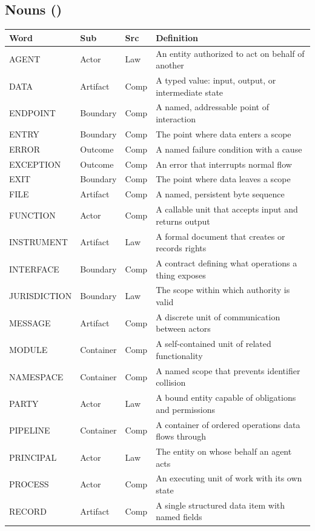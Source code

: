 \documentclass{article}
\begin{document}
\subsection{Nouns (\VocabNouns)}
\small
\begin{tabular}{lllp{7cm}}
\toprule \textbf{Word} & \textbf{Sub} & \textbf{Src} & \textbf{Definition} \\ \midrule
AGENT & Actor & Law & An entity authorized to act on behalf of another \\
DATA & Artifact & Comp & A typed value: input, output, or intermediate state \\
ENDPOINT & Boundary & Comp & A named, addressable point of interaction \\
ENTRY & Boundary & Comp & The point where data enters a scope \\
ERROR & Outcome & Comp & A named failure condition with a cause \\
EXCEPTION & Outcome & Comp & An error that interrupts normal flow \\
EXIT & Boundary & Comp & The point where data leaves a scope \\
FILE & Artifact & Comp & A named, persistent byte sequence \\
FUNCTION & Actor & Comp & A callable unit that accepts input and returns output \\
INSTRUMENT & Artifact & Law & A formal document that creates or records rights \\
INTERFACE & Boundary & Comp & A contract defining what operations a thing exposes \\
JURISDICTION & Boundary & Law & The scope within which authority is valid \\
MESSAGE & Artifact & Comp & A discrete unit of communication between actors \\
MODULE & Container & Comp & A self-contained unit of related functionality \\
NAMESPACE & Container & Comp & A named scope that prevents identifier collision \\
PARTY & Actor & Law & A bound entity capable of obligations and permissions \\
PIPELINE & Container & Comp & A container of ordered operations data flows through \\
PRINCIPAL & Actor & Law & The entity on whose behalf an agent acts \\
PROCESS & Actor & Comp & An executing unit of work with its own state \\
RECORD & Artifact & Comp & A single structured data item with named fields \\

\end{tabular}
\end{document}
